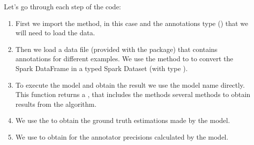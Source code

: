 \documentclass[letterpaper,10pt,english]{sphinxmanual}
\begin{document}
%
\begin{sphinxVerbatim}[commandchars=\\\{\}]
 
 

   

   \PYG{o}{[}\PYG{o}{]}

   

   \PYG{o}{[}\PYG{o}{]}

   
\end{sphinxVerbatim}

Let’s go through each step of the code:
\begin{enumerate}
\def\theenumi{\arabic{enumi}}
\def\labelenumi{\theenumi .}
\makeatletter\def\p@enumii{\p@enumi \theenumi .}\makeatother
\item {} 
First we import the method, in this case  and the annotations type () that we will need
to load the data.

\item {} 
Then we load a data file (provided with the package) that contains annotations for different examples. We use the method  to
to convert the Spark DataFrame in a typed Spark Dataset (with type ).

\item {} 
To execute the model and obtain the result we use the model name directly. This function returns a , that
includes the methods several methods to obtain results from the algorithm.

\item {} 
We use the   to obtain the ground truth estimations made by the model.

\item {} 
We use  to obtain for the annotator precisions calculated by the model.

\end{enumerate}
\end{document}
